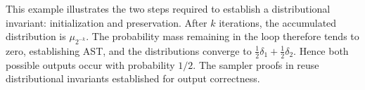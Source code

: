This example illustrates the two steps required to establish
a distributional invariant: initialization and preservation.
After $k$ iterations, the accumulated distribution is
$\mu_{2^{-k}}$.
The probability mass remaining in the loop therefore tends
to zero, establishing AST, and the distributions converge to
$\frac12\delta_1+\frac12\delta_2$.
Hence both possible outputs occur with probability $1/2$.
The sampler proofs in  reuse distributional
invariants established for output correctness.
